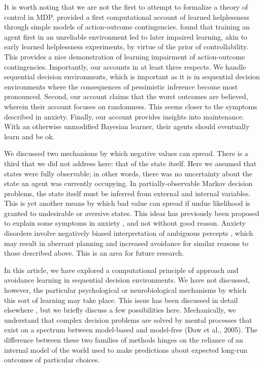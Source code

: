 \documentclass[11pt]{article} %
\begin{document}
It is worth noting that we are not the first to attempt to formalize a theory of control in MDP. \cite{HuysDayan2009} provided a first computational account of learned helplessness through simple models of action-outcome contingencies. \cite{HuysDayan2009} found that training an agent first in an unreliable environment led to later impaired learning, akin to early learned helplessness experiments, by virtue of the prior of controllability. This provides a nice demonstration of learning impairment of action-outcome contingencies. Importantly, our accounts in at least three respects. We handle sequential decision environments, which is important as it is in sequential decision environments where the consequences of pessimistic inference become most pronounced. Second, our account claims that the worst outcomes are believed, wherein their account focuses on randomness. This seems closer to the symptoms described in anxiety. Finally, our account provides insights into maintenance. With an otherwise unmodified Bayesian learner, their agents should eventually learn and be ok.

We discussed two mechanisms by which negative values can spread. There is a third that we did not address here: that of the state itself. Here we assumed that states were fully observable; in other words, there was no uncertainty about the state an agent was currently occupying. In partially-observable Markov decision problems, the state itself must be inferred from external and internal variables. This is yet another means by which bad value can spread if undue likelihood is granted to undesirable or aversive states. This ideas has previously been proposed to explain some symptoms in anxiety \citep{Paulus2012}, and not without good reason. Anxiety disorders involve negatively biased interpretation of ambiguous percepts \citep{Hartley2012}, which may result in aberrant planning and increased avoidance for similar reasons to those described above. This is an area for future research.

In this article, we have explored a computational principle of approach and avoidance learning in sequential decision environments. We have not discussed, however, the particular psychological or neurobiological mechanisms by which this sort of learning may take place. This issue has been discussed in detail elsewhere \citep{Bishop2018}, but we briefly discuss a few possibilities here. Mechanically, we understand that complex decision problems are solved by mental processes that exist on a spectrum between model-based and model-free (Daw et al., 2005). The difference between these two families of methods hinges on the reliance of an internal model of the world used to make predictions about expected long-run outcomes of particular choices.
\end{document}
